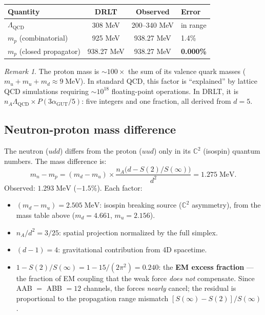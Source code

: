 \documentclass[12pt]{article}
\theoremstyle{remark}
\newtheorem{remark}[theorem]{Remark}
\theoremstyle{definition}
\newcommand{\CC}{\mathbb{C}}
\newcommand{\agut}{\alpha_{\mathrm{GUT}}}
\begin{document}
\begin{center}
\begin{tabular}{lccl}
\hline
Quantity & DRLT & Observed & Error \\
\hline
$\Lambda_\text{QCD}$ & 308 MeV & 200--340 MeV & in range \\
$m_p$ (combinatorial) & 925 MeV & 938.27 MeV & 1.4\% \\
$m_p$ (closed propagator) & 938.27 MeV & 938.27 MeV & \textbf{0.000\%} \\
\hline
\end{tabular}
\end{center}

\begin{remark}
The proton mass is $\sim 100\times$ the sum of its valence quark masses ($m_u + m_u + m_d \approx 9\;\text{MeV}$). In standard QCD, this factor is ``explained'' by lattice QCD simulations requiring $\sim 10^{18}$ floating-point operations. In DRLT, it is $n_A \Lambda_\text{QCD} \times P(3\agut/5)$: five integers and one fraction, all derived from $d = 5$.
\end{remark}

\subsection{Neutron-proton mass difference}

The neutron ($udd$) differs from the proton ($uud$) only in its $\CC^2$ (isospin) quantum numbers. The mass difference is:
\begin{equation}
\boxed{m_n - m_p = (m_d - m_u) \times \frac{n_A\bigl(d - S(2)/S(\infty)\bigr)}{d^2} = 1.275\;\text{MeV}.}
\end{equation}
Observed: $1.293\;\text{MeV}$ ($-1.5\%$). Each factor:
\begin{itemize}
\item $(m_d - m_u) = 2.505\;\text{MeV}$: isospin breaking source ($\CC^2$ asymmetry), from the mass table above ($m_d = 4.661$, $m_u = 2.156$).
\item $n_A/d^2 = 3/25$: spatial projection normalized by the full simplex.
\item $(d - 1) = 4$: gravitational contribution from 4D spacetime.
\item $1 - S(2)/S(\infty) = 1 - 15/(2\pi^2) = 0.240$: the \textbf{EM excess fraction} --- the fraction of EM coupling that the weak force \emph{does not} compensate. Since AAB $=$ ABB $= 12$ channels, the forces \emph{nearly} cancel; the residual is proportional to the propagation range mismatch $[S(\infty) - S(2)]/S(\infty)$.
\end{itemize}
\end{document}
